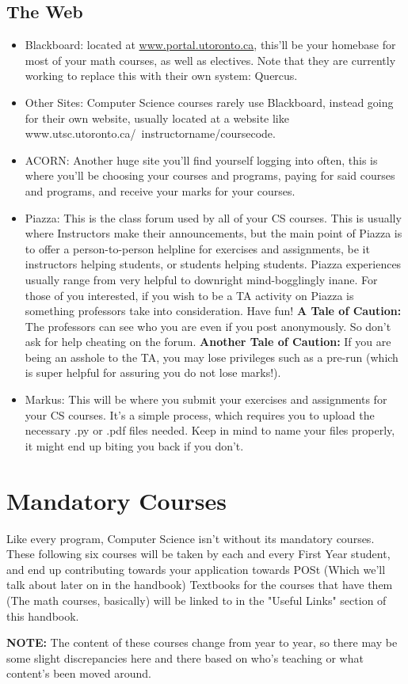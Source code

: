 \documentclass[11pt]{article}
\begin{document}
\subsection{The Web}
\begin{itemize}
\item Blackboard: located at \url{www.portal.utoronto.ca}, this'll be your homebase for most of your math courses, as well as electives. Note that they are currently working to replace this with their own system: Quercus.
\item Other Sites: Computer Science courses rarely use Blackboard, instead going for their own website, usually located at a website like www.utsc.utoronto.ca/~instructorname/coursecode.
\item ACORN: Another huge site you'll find yourself logging into often, this is where you'll be choosing your courses and programs, paying for said courses and programs, and receive your marks for your courses.
\item Piazza: This is the class forum used by all of your CS courses. This is usually where Instructors make their announcements, but the main point of Piazza is to offer a person-to-person helpline for exercises and assignments, be it instructors helping students, or students helping students. Piazza experiences usually range from very helpful to downright mind-bogglingly inane. For those of you interested, if you wish to be a TA activity on Piazza is something professors take into consideration. Have fun! \textbf{A Tale of Caution:} The professors can see who you are even if you post anonymously. So don't ask for help cheating on the forum. \textbf{Another Tale of Caution:} If you are being an asshole to the TA, you may lose privileges such as a pre-run (which is super helpful for assuring you do not lose marks!).
\item Markus: This will be where you submit your exercises and assignments for your CS courses. It's a simple process, which requires you to upload the necessary .py or .pdf files needed. Keep in mind to name your files properly, it might end up biting you back if you don't.
 
\end{itemize}

\section{Mandatory Courses}
Like every program, Computer Science isn't without its mandatory courses.  These following six courses will be taken by each and every First Year student, and end up contributing towards your application towards POSt (Which we'll talk about later on in the handbook) Textbooks for the courses that have them (The math courses, basically) will be linked to in the "Useful Links" section of this handbook.\par  \textbf{NOTE:} The content of these courses change from year to year, so there may be some slight discrepancies here and there based on who's teaching or what content's been moved around.
\end{document}
